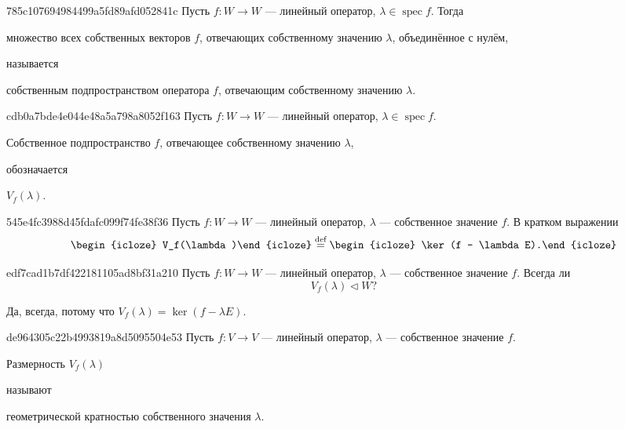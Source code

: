 \begin{note}{785c107694984499a5fd89afd052841c}
    Пусть \( f : W \to W \) --- линейный оператор, \( \lambda \in \operatorname{spec} f \).
    Тогда \begin{icloze}{2}множество всех собственных векторов \( f \), отвечающих собственному значению \( \lambda \), объединённое с нулём,\end{icloze} называется \begin{icloze}{1}собственным подпространством оператора \( f \), отвечающим собственному значению \({ \lambda }\).\end{icloze}
\end{note}

\begin{note}{cdb0a7bde4e044e48a5a798a8052f163}
    Пусть \( f : W \to W \) --- линейный оператор, \( \lambda \in \operatorname{spec} f \).
    \begin{icloze}{1}Собственное подпространство \({ f }\), отвечающее собственному значению \({ \lambda }\),\end{icloze} обозначается \begin{icloze}{2}\( V_{f} (\lambda) \).\end{icloze}
\end{note}

\begin{note}{545e4fc3988d45fdafc099f74fe38f36}
    Пусть \( f : W \to W \) --- линейный оператор, \( \lambda \) --- собственное значение \( f \).
    В кратком выражении
    \[
        \begin{icloze}{2}V_f(\lambda)\end{icloze} \overset{\text{def}}= \begin{icloze}{1}\ker (f - \lambda E).\end{icloze}
    \]
\end{note}

\begin{note}{edf7cad1b7df422181105ad8bf31a210}
    Пусть \( f : W \to W \) --- линейный оператор, \( \lambda \) --- собственное значение \( f \).
    Всегда ли
    \[
        V_{f} (\lambda) \triangleleft W?
    \]

    \begin{cloze}{1}
        Да, всегда, потому что \( V_{f} (\lambda) = \ker (f - \lambda E) \).
    \end{cloze}
\end{note}

\begin{note}{de964305c22b4993819a8d5095504e53}
    Пусть \( f : V \to V \) --- линейный оператор, \( \lambda \) --- собственное значение \( f \).
    \begin{icloze}{1}Размерность \( V_f (\lambda) \)\end{icloze} называют \begin{icloze}{2}геометрической кратностью собственного значения \( \lambda \).\end{icloze}
\end{note}

